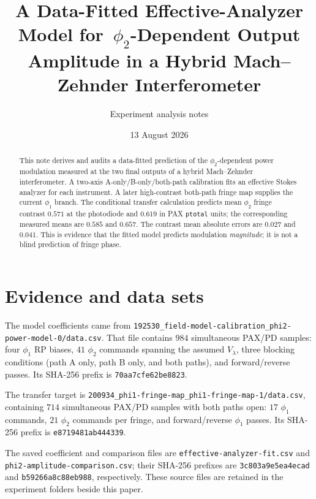 \documentclass[10pt]{article}
\title{A Data-Fitted Effective-Analyzer Model for\
\boldmath$\phi_2$-Dependent Output Amplitude in a Hybrid Mach--Zehnder Interferometer}
\author{Experiment analysis notes}
\date{13 August 2026}
\begin{document}
\maketitle

\begin{abstract}
This note derives and audits a data-fitted prediction of the $\phi_2$-dependent
power modulation measured at the two final outputs of a hybrid
Mach--Zehnder interferometer. A two-axis A-only/B-only/both-path calibration
fits an effective Stokes analyzer for each instrument. A later high-contrast
both-path fringe map supplies the current $\phi_1$ branch. The conditional
transfer calculation predicts mean $\phi_2$ fringe contrast $0.571$ at the
photodiode and $0.619$ in PAX \texttt{ptotal} units; the corresponding measured
means are $0.585$ and $0.657$. The contrast mean absolute errors are $0.027$
and $0.041$. This is evidence that the fitted model predicts modulation
\emph{magnitude}; it is not a blind prediction of fringe phase.
\end{abstract}

\section{Evidence and data sets}
The model coefficients came from
\texttt{192530\_field-model-calibration\_phi2-power-model-0/data.csv}.
That file contains $984$ simultaneous PAX/PD samples: four $\phi_1$ RP biases,
$41$ $\phi_2$ commands spanning the assumed $V_\lambda$, three blocking
conditions (path A only, path B only, and both paths), and forward/reverse
passes. Its SHA-256 prefix is \texttt{70aa7cfe62be8823}.

The transfer target is
\texttt{200934\_phi1-fringe-map\_phi1-fringe-map-1/data.csv}, containing
$714$ simultaneous PAX/PD samples with both paths open: $17$ $\phi_1$
commands, $21$ $\phi_2$ commands per fringe, and forward/reverse $\phi_1$
passes. Its SHA-256 prefix is \texttt{e8719481ab444339}.

The saved coefficient and comparison files are
\texttt{effective-analyzer-fit.csv} and
\texttt{phi2-amplitude-comparison.csv}; their SHA-256 prefixes are
\texttt{3c803a9e5ea4ecad} and \texttt{b59266a8c88eb988}, respectively.
These source files are retained in the experiment folders beside this paper.
\end{document}

